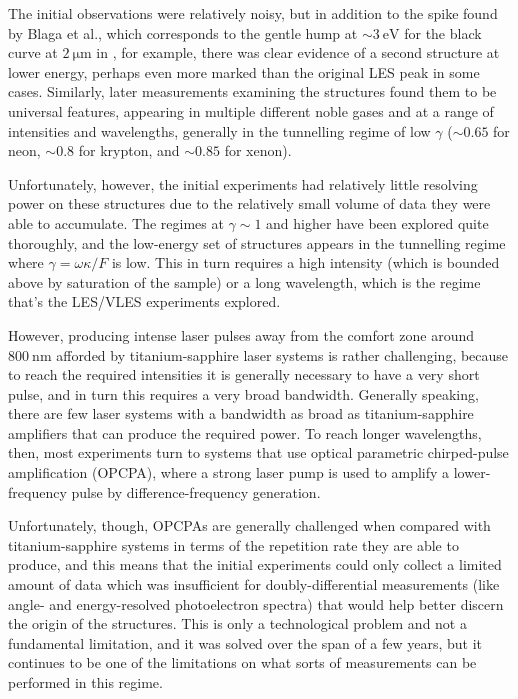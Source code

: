 The initial observations were relatively noisy, but in addition to the spike found by Blaga et al., which corresponds to the gentle hump at ${\sim}\SI{3}{\electronvolt}$ for the black curve at $\SI{2}{\micro\meter}$ in , for example, there was clear evidence of a second structure at lower energy, perhaps even more marked than the original LES peak in some cases. Similarly, later measurements \cite{VLES_characterization} examining the structures found them to be universal features, appearing in multiple different noble gases and at a range of intensities and wavelengths, generally in the tunnelling regime of low $\gamma$ (${\sim}0.65$ for neon, ${\sim}0.8$ for krypton, and ${\sim}0.85$ for xenon).




Unfortunately, however, the initial experiments had relatively little resolving power on these structures due to the relatively small volume of data they were able to accumulate. The regimes at $\gamma \sim 1$ and higher have been explored quite thoroughly, and the low-energy set of structures appears in the tunnelling regime where $\gamma = \omega \kappa / F$ is low. This in turn requires a high intensity (which is bounded above by saturation of the sample) or a long wavelength, which is the regime that's the LES/VLES experiments explored.





However, producing intense laser pulses away from the comfort zone around $\SI{800}{\nano\meter}$ afforded by titanium-sapphire laser systems is rather challenging, because to reach the required intensities it is generally necessary to have a very short pulse, and in turn this requires a very broad bandwidth. Generally speaking, there are few laser systems with a bandwidth as broad as titanium-sapphire amplifiers that can produce the required power. To reach longer wavelengths, then, most experiments turn to systems that use optical parametric chirped-pulse amplification (OPCPA), where a strong laser pump is used to amplify a lower-frequency pulse by difference-frequency generation. 

Unfortunately, though, OPCPAs are generally challenged when compared with ti\-ta\-nium-sapphire systems in terms of the repetition rate they are able to produce, and this means that the initial experiments could only collect a limited amount of data which was insufficient for doubly-differential measurements (like angle- and energy-resolved photoelectron spectra) that would help better discern the origin of the structures. This is only a technological problem and not a fundamental limitation, and it was solved over the span of a few years, but it continues to be one of the limitations on what sorts of measurements can be performed in this regime.



